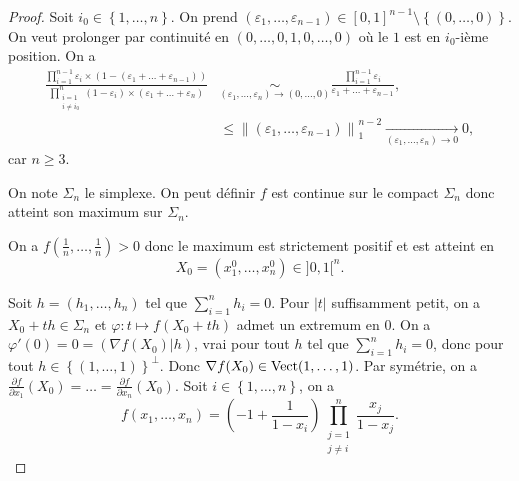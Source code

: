 \documentclass[12pt]{article}
\begin{document}
\begin{proof}
	Soit $i_0\in\left\lbrace1,\dots,n\right\rbrace$. On prend $(\varepsilon_1,\dots,\varepsilon_{n-1})\in[0,1]^{n-1}\setminus\left\lbrace(0,\dots,0)\right\rbrace$. On veut prolonger par continuité en $(0,\dots,0,1,0,\dots,0)$ où le $1$ est en $i_{0}$-ième position. On a
	\begin{align}
		\frac{\prod_{i=1}^{n-1}\varepsilon_i\times\left(1-\left(\varepsilon_1+\dots+\varepsilon_{n-1}\right)\right)}{\prod_{\substack{i=1\\i\neq i_0}}^{n}\left(1-\varepsilon_i\right)\times\left(\varepsilon_1+\dots+\varepsilon_n\right)}
		&\underset{(\varepsilon_1,\dots,\varepsilon_n)\to(0,\dots,0)}{\sim}\frac{\prod_{i=1}^{n-1}\varepsilon_i}{\varepsilon_{1}+\dots+\varepsilon_{n-1}},\\
		&\leqslant\left\lVert(\varepsilon_1,\dots,\varepsilon_{n-1})\right\rVert_{1}^{n-2}\xrightarrow[(\varepsilon_1,\dots,\varepsilon_n)\to0]{}0,
	\end{align}
	car $n\geqslant3$.

	On note $\Sigma_n$ le simplexe.
	On peut définir 
	$f$ est continue sur le compact $\Sigma_{n}$ donc atteint son maximum sur $\Sigma_n$.

	On a $f\left(\frac{1}{n},\dots,\frac{1}{n}\right)>0$ donc le maximum est strictement positif et est atteint en 
	\begin{equation}
		X_0=(x_{1}^{0},\dots,x_{n}^{0})\in]0,1[^{n}.	
	\end{equation}

	Soit $h=(h_1,\dots,h_n)$ tel que $\sum_{i=1}^{n}h_i=0$. Pour $\left\lvert t\right\rvert$ suffisamment petit, on a $X_0+th\in\Sigma_n$ et $\varphi\colon t\mapsto f(X_0+th)$ admet un extremum en 0. On a $\varphi'(0)=0=(\nabla f(X_0)|h)$, vrai pour tout $h$ tel que $\sum_{i=1}^{n}h_i=0$, donc pour tout $h\in\left\lbrace(1,\dots,1)\right\rbrace^{\perp}$. Donc $\nabla f(X_0)\in\operatorname{Vect}(1,\dots,1)$. Par symétrie, on a $\frac{\partial f}{\partial x_1}(X_0)=\dots=\frac{\partial f}{\partial x_n}(X_0)$. Soit $i\in\left\lbrace1,\dots,n\right\rbrace$, on a 
	\begin{equation}
		f(x_1,\dots,x_n)=\left(-1+\frac{1}{1-x_i}\right)\prod_{\substack{j=1\\j\neq i}}^{n}\frac{x_j}{1-x_j}.
	\end{equation}


\end{proof}
\end{document}
